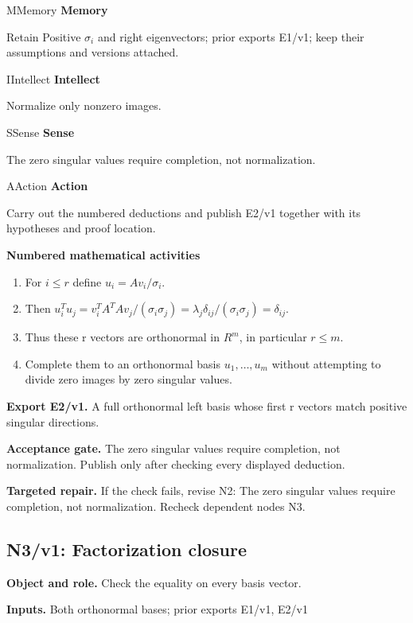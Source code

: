 \documentclass[preprint,12pt,aps,pra,showkeys,amsmath,amssymb,superscriptaddress,floatfix]{revtex4-2}
\theoremstyle{definition}
\theoremstyle{remark}
\newcommand{\mmfaculty}[3]{%
 \begin{mmfacultybox}{#1}{#2}
 {\sffamily\bfseries\color{MMBlue}#2}\par\smallskip #3
 \end{mmfacultybox}}
\newcommand{\field}[2]{\par\smallskip\noindent\textbf{#1.} #2\par}
\begin{document}
\mmfaculty{M}{Memory}{Retain Positive \(\sigma _i\) and right eigenvectors; prior exports
E1/v1; keep their assumptions and versions attached.}

\mmfaculty{I}{Intellect}{Normalize only nonzero images.}

\mmfaculty{S}{Sense}{The zero singular values require completion, not normalization.}

\mmfaculty{A}{Action}{Carry out the numbered deductions and publish E2/v1 together with its
hypotheses and proof location.}

\smallskip\noindent\textbf{Numbered mathematical activities}

\begin{enumerate}[label=N2.\arabic*,leftmargin=3.4em]

\item For \(i\le r\) define \(u_i=Av_i/\sigma _i\).

\item Then
\(u_i^{T}u_j=v_i^{T}A^{T}Av_j/(\sigma _i\sigma _j)=\lambda _j\delta _{ij}/(\sigma _i\sigma _j)=\delta _{ij}\).

\item Thus these r vectors are orthonormal in \(R^{m}\), in particular
\(r\le m\).

\item Complete them to an orthonormal basis \(u_{1},\ldots ,u_m\) without
attempting to divide zero images by zero singular values.

\end{enumerate}

\field{Export E2/v1}{A full orthonormal left basis whose first r vectors match positive
singular directions.}

\field{Acceptance gate}{The zero singular values require completion, not normalization. Publish
only after checking every displayed deduction.}

\field{Targeted repair}{If the check fails, revise N2: The zero singular values require
completion, not normalization. Recheck dependent nodes N3.}

\clearpage

\subsection{N3/v1: Factorization closure}

\field{Object and role}{Check the equality on every basis vector.}

\field{Inputs}{Both orthonormal bases; prior exports E1/v1, E2/v1}
\end{document}
